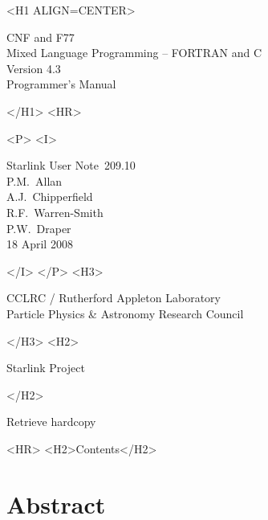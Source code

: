 \documentclass[twoside,11pt]{article}
\newcommand{\stardoccategory}  {Starlink User Note}
\newcommand{\stardocsource}    {sun\stardocnumber}
\newcommand{\stardocnumber}    {209.10}
\newcommand{\stardocauthors}   {P.M.\ Allan\\
                                A.J.\ Chipperfield\\
                                R.F.\ Warren-Smith\\
                                P.W.\ Draper}
\newcommand{\stardocdate}      {18 April 2008}
\newcommand{\stardoctitle}     {CNF and F77 \\ [1ex]
                                Mixed Language Programming -- FORTRAN and C}
\newcommand{\stardocversion}   {Version 4.3}
\newcommand{\stardocmanual}    {Programmer's Manual}
\newcommand{\htmladdnormallink}[2]{#1}
\newcommand{\htmladdimg}[1]{}
\newcommand{\htmlref}[2]{#1}
\newcommand{\htmladdtonavigation}[1]{}
\newcommand{\xlabel}[1]{}
\renewcommand{\_}{\texttt{\symbol{95}}}
\begin{document}
\begin{htmlonly}
   \xlabel{}
   \begin{rawhtml} <H1 ALIGN=CENTER> \end{rawhtml}
      \stardoctitle\\
      \stardocversion\\
      \stardocmanual
   \begin{rawhtml} </H1> <HR> \end{rawhtml}


   \begin{rawhtml} <P> <I> \end{rawhtml}
   \stardoccategory\ \stardocnumber \\
   \stardocauthors \\
   \stardocdate
   \begin{rawhtml} </I> </P> <H3> \end{rawhtml}
      \htmladdnormallink{CCLRC}{http://www.cclrc.ac.uk} /
      \htmladdnormallink{Rutherford Appleton Laboratory}
                        {http://www.cclrc.ac.uk/ral} \\
      \htmladdnormallink{Particle Physics \& Astronomy Research Council}
                        {http://www.pparc.ac.uk} \\
   \begin{rawhtml} </H3> <H2> \end{rawhtml}
      \htmladdnormallink{Starlink Project}{http://www.starlink.ac.uk/}
   \begin{rawhtml} </H2> \end{rawhtml}
   \htmladdnormallink{\htmladdimg{source.gif} Retrieve hardcopy}
      {http://www.starlink.ac.uk/cgi-bin/hcserver?\stardocsource}\\

  \label{stardoccontents}
  \begin{rawhtml} 
    <HR>
    <H2>Contents</H2>
  \end{rawhtml}
  \htmladdtonavigation{\htmlref{\htmladdimg{contents_motif.gif}}
        {stardoccontents}}

  \section{\xlabel{abstract}Abstract}
\end{htmlonly}
\end{document}
